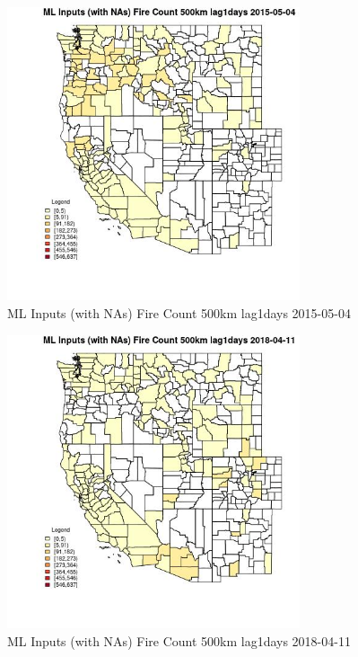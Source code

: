 \begin{figure} 
\centering  
\includegraphics[width=0.77\textwidth]{Code_Outputs/Report_ML_input_PM25_Step4_part_e_de_duplicated_aves_compiled_2019-05-18wNAs_CountyFire_Count_500km_lag1daysMean2015-05-04.jpg} 
\caption{\label{fig:Report_ML_input_PM25_Step4_part_e_de_duplicated_aves_compiled_2019-05-18wNAsCountyFire_Count_500km_lag1daysMean2015-05-04}ML Inputs (with NAs) Fire Count 500km lag1days 2015-05-04} 
\end{figure} 
 

\begin{figure} 
\centering  
\includegraphics[width=0.77\textwidth]{Code_Outputs/Report_ML_input_PM25_Step4_part_e_de_duplicated_aves_compiled_2019-05-18wNAs_CountyFire_Count_500km_lag1daysMean2018-04-11.jpg} 
\caption{\label{fig:Report_ML_input_PM25_Step4_part_e_de_duplicated_aves_compiled_2019-05-18wNAsCountyFire_Count_500km_lag1daysMean2018-04-11}ML Inputs (with NAs) Fire Count 500km lag1days 2018-04-11} 
\end{figure} 
 

